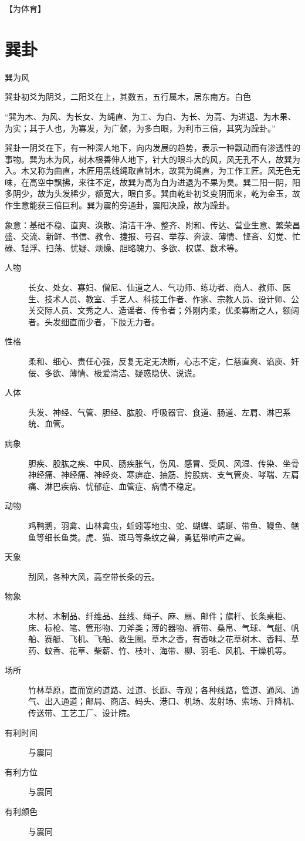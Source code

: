 \documentclass[12pt,oneside]{book}
\begin{document}
【为体育】



\section{巽卦}
巽为风

巽卦初爻为阴爻，二阳爻在上，其数五，五行属木，居东南方。白色

“巽为木、为风、为长女、为绳直、为工、为白、为长、为高、为进退、为木果、为实；其于人也，为寡发，为广颡，为多白眼，为利市三倍，其究为躁卦。”

巽卦一阴爻在下，有一种深人地下，向内发展的趋势，表示一种飘动而有渗透性的事物。巽为木为风，树木根善伸人地下，针大的眼斗大的风，风无孔不人，故巽为入。木又称为曲直，木匠用黑线绳取直制木，故巽为绳直，为工作工匠。风无色无味，在高空中飘拂，来往不定，故巽为高为白为进退为不果为臭。巽二阳一阴，阳多阴少，故为头发稀少，额宽大，眼白多。巽由乾卦初爻变阴而来，乾为金玉，故作生意能获三倍巨利。巽为震的旁通卦，震阳决躁，故为躁卦。

象意：基础不稳、直爽、涣散、清洁干净、整齐、附和、传达、营业生意、繁荣昌盛、交流、新鲜、书信、教令、捷报、号召、举荐、奔波、薄情、悭吝、幻觉、忙碌、轻浮、扫荡、忧疑、烦燥、胆略魄力、多欲、权谋、数术等。


\begin{description}
\item[人物] 长女、处女、寡妇、僧尼、仙道之人、气功师、练功者、商人、教师、医生、技术人员、教室、手艺人、科技工作者、作家、宗教人员、设计师、公关交际人员、文秀之人、造谣者、传令者；外刚内柔，优柔寡断之人，额阔者。头发细直而少者，下肢无力者。
\item[性格] 柔和、细心、责任心强，反复无定无决断，心志不定，仁慈直爽、谄庾、奸佞、多欲、薄情、极爱清洁、疑惑隐伏、说谎。
\item[人体] 头发、神经、气管、胆经、肱股、呼吸器官、食道、肠道、左肩、淋巴系统、血管。
\item[病象] 胆疾、股肱之疾、中风、肠疾胀气，伤风、感冒、受风、风湿、传染、坐骨神经痛、神经痛、神经炎、寒痹症、抽筋、胯股病、支气管炎、哮喘、左肩痛、淋巴疾病、忧郁症、血管症、病情不稳定。
\item[动物] 鸡鸭鹅，羽禽、山林禽虫，蚯蚓等地虫、蛇、蝴蝶、蜻蜒、带鱼、鳗鱼、鳝鱼等细长鱼类。虎、猫、斑马等条纹之兽，勇猛带响声之兽。
\item[天象] 刮风，各种大风，高空带长条的云。
\item[物象] 木材、木制品、纤维品、丝线、绳子、麻、扇、邮件；旗杆、长条桌柜、床、标枪、笔、管形物、刀斧类；薄的器物、裤带、桑帛、气球、气艇、帆船、赛艇、飞机、飞船、救生圈。草木之香，有香味之花草树木、香料、草药、蚊香、花草、柴薪、竹、枝叶、海带、柳、羽毛、风机、干燥机等。
\item[场所] 竹林草原，直而宽的道路、过道、长廊、寺观；各种线路，管道、通风、通气、出入通道；邮局、商店、码头、港口、机场、发射场、索场、升降机、传送带、工艺工厂、设计院。
\item[有利时间] 与震同
\item[有利方位] 与震同
\item[有利颜色] 与震同
\end{description}
\end{document}
